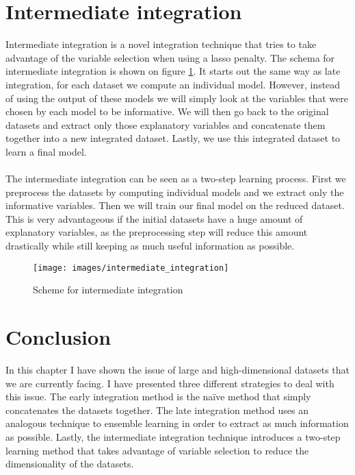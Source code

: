 \section{Intermediate integration}
\label{sec:integration-intermediate}
Intermediate integration is a novel integration technique that tries to take advantage of the variable selection when using a lasso penalty. The schema for intermediate integration is shown on figure \ref{fig:integration-intermediate}. It starts out the same way as late integration, for each dataset we compute an individual model. However, instead of using the output of these models we will simply look at the variables that were chosen by each model to be informative. We will then go back to the original datasets and extract only those explanatory variables and concatenate them together into a new integrated dataset. Lastly, we use this integrated dataset to learn a final model. \\ \\
The intermediate integration can be seen as a two-step learning process. First we preprocess the datasets by computing individual models and we extract only the informative variables. Then we will train our final model on the reduced dataset. This is very advantageous if the initial datasets have a huge amount of explanatory variables, as the preprocessing step will reduce this amount drastically while still keeping as much useful information as possible.
\begin{figure}
	\centering
	\texttt{[image: images/intermediate\_integration]}
	\caption{Scheme for intermediate integration}
	\label{fig:integration-intermediate}
\end{figure}
\section{Conclusion}
\label{sec:integration-conclusion}
In this chapter I have shown the issue of large and high-dimensional datasets that we are currently facing. I have presented three different strategies to deal with this issue. The early integration method is the na\"{i}ve method that simply concatenates the datasets together. The late integration method uses an analogous technique to ensemble learning in order to extract as much information as possible. Lastly, the intermediate integration technique introduces a two-step learning method that takes advantage of variable selection to reduce the dimensionality of the datasets.
